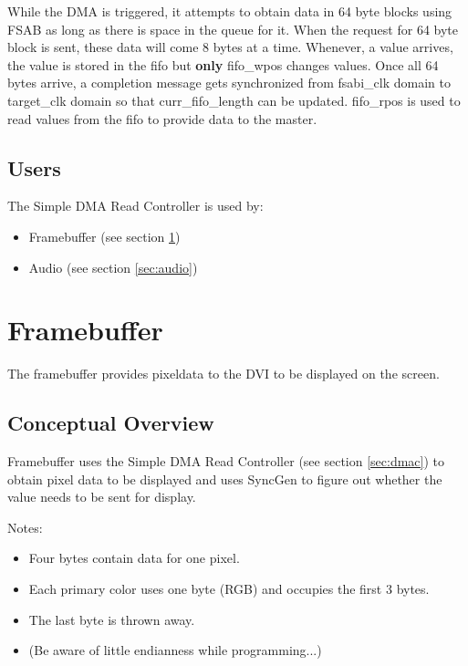 \documentclass[10pt]{article}
\begin{document}
While the DMA is triggered, it attempts to obtain data in 64 byte blocks
using FSAB as long as there is space in the queue for it. When the request
for 64 byte block is sent, these data will come 8 bytes at a time. Whenever,
a value arrives, the value is stored in the fifo but \textbf{only} fifo\_wpos changes
values. Once all 64 bytes arrive, a completion message gets synchronized
from fsabi\_clk domain to target\_clk domain so that curr\_fifo\_length can be
updated. fifo\_rpos is used to read values from the fifo to provide data to
the master.

\subsection{Users}

The Simple DMA Read Controller is used by:

\begin{itemize}
\item{Framebuffer (see section \ref{sec:framebuffer})}
\item{Audio (see section \ref{sec:audio})}
\end{itemize}

\section{Framebuffer}
\label{sec:framebuffer}

The framebuffer provides pixeldata to the DVI to be displayed on the screen.

\subsection{Conceptual Overview}

Framebuffer uses the Simple DMA Read Controller (see section \ref{sec:dmac})
to obtain pixel data to be displayed and uses SyncGen to figure out whether
the value needs to be sent for display.

Notes:

\begin{itemize}
\item{Four bytes contain data for one pixel.}
\item{Each primary color uses one byte (RGB) and occupies the first 3
bytes.}
\item{The last byte is thrown away.}
\item{(Be aware of little endianness while programming...)}
\end{itemize}
\end{document}
